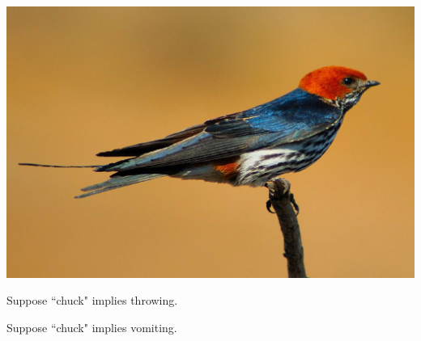 \documentclass[11pt]{article}
\begin{document}



\begin{question}


\begin{center}
	\includegraphics[width=0.5\columnwidth]{swallow.jpg} %
\end{center}


\end{question}


\begin{question}



\begin{subquestion}{Suppose ``chuck" implies throwing.} %


\end{subquestion}


\begin{subquestion}{Suppose ``chuck" implies vomiting.} %


\end{subquestion}


\end{question}
\end{document}
